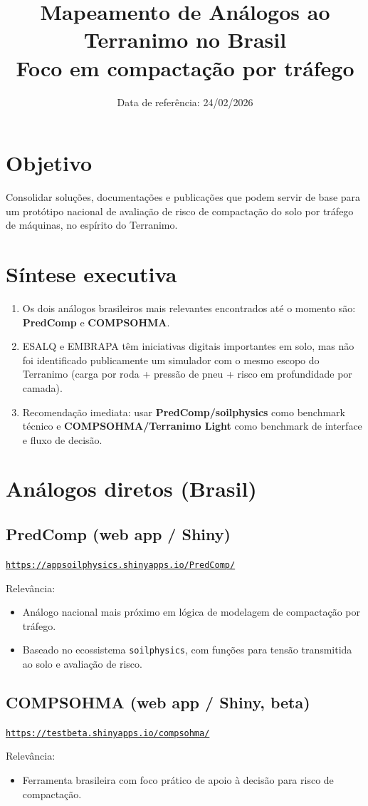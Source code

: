 \documentclass[12pt,a4paper]{article}
\title{Mapeamento de Análogos ao Terranimo no Brasil\\
\large Foco em compactação por tráfego}
\author{}
\date{Data de referência: 24/02/2026}
\newcommand{\Section}[1]{\needspace{12\baselineskip}\section{#1}}
\newcommand{\SubsectionKeep}[1]{\needspace{10\baselineskip}\subsection{#1}}
\newcommand{\Link}[1]{\href{#1}{\nolinkurl{#1}}}
\newenvironment{NoBreakEnumerate}
{\begin{samepage}\begin{enumerate}}
{\end{enumerate}\end{samepage}}
\newenvironment{NoBreakItemize}
{\begin{samepage}\begin{itemize}}
{\end{itemize}\end{samepage}}
\begin{document}
\maketitle
\vspace{-1.2em}

\Section{Objetivo}
Consolidar soluções, documentações e publicações que podem servir de base para um protótipo nacional de avaliação de risco de compactação do solo por tráfego de máquinas, no espírito do Terranimo.

\Section{Síntese executiva}
\begin{NoBreakEnumerate}
  \item Os dois análogos brasileiros mais relevantes encontrados até o momento são: \textbf{PredComp} e \textbf{COMPSOHMA}.
  \item ESALQ e EMBRAPA têm iniciativas digitais importantes em solo, mas não foi identificado publicamente um simulador com o mesmo escopo do Terranimo (carga por roda + pressão de pneu + risco em profundidade por camada).
  \item Recomendação imediata: usar \textbf{PredComp/soilphysics} como benchmark técnico e \textbf{COMPSOHMA/Terranimo Light} como benchmark de interface e fluxo de decisão.
\end{NoBreakEnumerate}

\Section{Análogos diretos (Brasil)}

\SubsectionKeep{PredComp (web app / Shiny)}
\Link{https://appsoilphysics.shinyapps.io/PredComp/}

Relevância:
\begin{NoBreakItemize}
  \item Análogo nacional mais próximo em lógica de modelagem de compactação por tráfego.
  \item Baseado no ecossistema \texttt{soilphysics}, com funções para tensão transmitida ao solo e avaliação de risco.
\end{NoBreakItemize}

\SubsectionKeep{COMPSOHMA (web app / Shiny, beta)}
\Link{https://testbeta.shinyapps.io/compsohma/}

Relevância:
\begin{NoBreakItemize}
  \item Ferramenta brasileira com foco prático de apoio à decisão para risco de compactação.
\end{NoBreakItemize}
\end{document}
